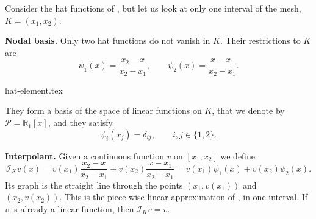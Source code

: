 \begin{example}[The linear Lagrange element in $d = 1$]
    \label{ex:Lagrange element in an interval}
    Consider the hat functions of , but let us look at only one interval of the mesh, $K = (x_1, x_2)$.

    \medskip
    \noindent\textbf{Nodal basis.}
    Only two hat functions do not vanish in $K$. Their restrictions to $K$ are
    \begin{equation*}
        \psi_1(x) = \frac{x_2 - x}{x_2-x_1},
        \qquad
        \psi_2(x) = \frac{x-x_1}{x_2-x_1} .
    \end{equation*}
    \begin{center}
        {hat-element.tex}
    \end{center}
    They form a basis of the space of linear functions on $K$, that we denote by $\mathcal P = \mathbb R_1[x]$, and they satisfy
    \begin{equation*}
        \psi_i(x_j) = \delta_{ij}, \qquad i, j \in \{1, 2\}.
    \end{equation*}

    \medskip
    \noindent\textbf{Interpolant.}
    Given a continuous function $v$ on $[x_1,x_2]$ we define
    \begin{equation*}
        \mathcal I_K v (x) = v(x_1) \frac{x_2-x}{x_2-x_1} + v(x_2) \frac{x - x_1}{x_2-x_1} = v(x_1) \psi_1(x) + v(x_2) \psi_2(x).
    \end{equation*}
    Its graph is the straight line through the points $(x_1, v(x_1))$ and $(x_2, v(x_2))$.
    This is the piece-wise linear approximation of , in one interval.
    If $v$ is already a linear function, then $\mathcal I_K v = v$.


\end{example}
